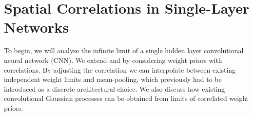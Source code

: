 \documentclass[tablecaption=bottom,wcp,nonatbib]{jmlr} %
\newcommand{\vX}{\mathbf{X}}
\newcommand{\vW}{\mathbf{W}}
\newcommand{\vA}{\mathbf{A}}
\begin{document}
\section{Spatial Correlations in Single-Layer Networks}
\label{sec:single-layer}
To begin, we will analyse the infinite limit of a single hidden layer
convolutional neural network (CNN). We extend \citet{garriga2018infiniteconv} and \citet{novak2019infiniteconv} by considering weight priors with correlations. By adjusting the correlation we can interpolate between existing independent weight limits and mean-pooling, which previously had to be introduced as a discrete architectural choice. We also discuss how existing convolutional Gaussian processes \citep{vdw2017convgp,dutordoir2020} can be obtained from limits of correlated weight priors.


\newcommand{\layerC}[1]{C^{(#1)}}
\newcommand{\layerw}[1]{P^{#1}}
\newcommand{\layerh}[1]{Q^{#1}}
\newcommand{\layersize}[1]{\layerw{#1}\cdot\layerh{#1}}
\newcommand{\patchw}[1]{p^{(#1)}}
\newcommand{\patchh}[1]{q^{(#1)}}
\newcommand{\patchsize}[1]{\patchw{#1}\patchh{#1}}
\newcommand{\patchidx}{q}
\newcommand{\W}[1]{\vW}
\newcommand{\layerWs}[1]{W^{(#1)}}
\newcommand{\layerW}[1]{\vW^{(#1)}}
\newcommand{\priorWcov}[1]{\boldsymbol{\Sigma}^{(#1)}}
\newcommand{\priorWcovs}[1]{\Sigma^{(#1)}}
\newcommand{\layerA}[2]{\mathbf{Z}^{(#1)}_{#2}(\vX)}
\newcommand{\layerAd}[2]{\mathbf{Z}^{(#1)}_{#2}(\vX')}
\newcommand{\layerAs}[2]{Z^{\!(#1)}_{#2}\!(\vX)}
\newcommand{\layerAsd}[2]{Z^{\!(#1)}_{#2}\!(\vX')}
\newcommand{\layerNLAs}[2]{A^{\!#1}_{#2}(\vX)}
\newcommand{\layerNLAsd}[2]{A^{\!#1}_{#2}(\vX')}
\newcommand{\layerNLA}[2]{\vA^{\!#1}_{#2}\!(\vX)}
\newcommand{\layerNLAd}[2]{\vA^{\!#1}_{#2}\!(\vX')}
\newcommand{\chan}{c}
\newcommand{\prevchan}{\gamma}   %
\newcommand{\patch}{p}               %
\newcommand{\nextpatch}{\mu}
\end{document}
